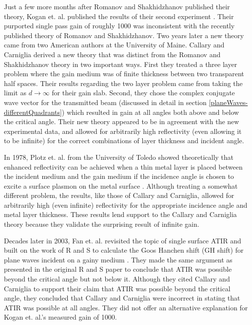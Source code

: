 \documentclass[12pt]{uthesis-v12}
\begin{document}
Just a few more months after Romanov and Shakhidzhanov published their theory, Kogan et. al. published the results of their second experiment \cite{Kogan2}. Their purported single pass gain of roughly 1000 was inconsistent with the recently published theory of Romanov and Shakhidzhanov.  Two years later a new theory came from two American authors at the University of Maine. Callary and Carniglia derived a new theory that was distinct from the Romanov and Shakhidzhanov theory in two important ways. First they treated a three layer problem where the gain medium was of finite thickness between two transparent half spaces. Their results regarding the two layer problem came from taking the limit as $d\to\infty$ for their gain slab. Second, they chose the complex conjugate wave vector for the transmitted beam (discussed in detail in section \ref{planeWaves-differentQuadrants}) which resulted in gain at all angles both above and below the critical angle. Their new theory appeared to be in agreement with the new experimental data, and allowed for arbitrarily high reflectivity (even allowing it to be infinite) for the correct combinations of layer thickness and incident angle.

In 1978, Plotz et. al. from the University of Toledo showed theoretically that enhanced reflectivity can be achieved when a thin metal layer is placed between the incident medium and the gain medium if the incidence angle is chosen to excite a surface plasmon on the metal surface \cite{Plotz}. Although treating a somewhat different problem, the results, like those of Callary and Carniglia, allowed for arbitrarily high (even infinite) reflectivity for the appropriate incidence angle and metal layer thickness. These results lend support to the Callary and Carniglia theory because they validate the surprising result of infinite gain.

Decades later in 2003, Fan et. al. revisited the topic of single surface ATIR and built on the work of R and S to calculate the Goos Hanchen shift (GH shift) for plane waves incident on a gainy medium \cite{Fan}. They made the same argument as presented in the original R and S paper to conclude that ATIR was possible beyond the critical angle but not below it.  Although they cited Callary and Carniglia to support their claim that ATIR was possible beyond the critical angle, they concluded that Callary and Carniglia were incorrect in stating that ATIR was possible at all angles. They did not offer an alternative explanation for Kogan et. al.'s measured gain of 1000.
\end{document}

